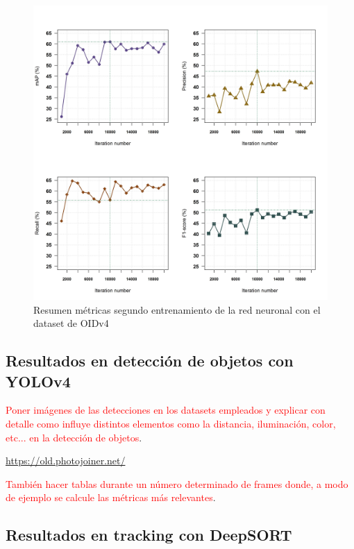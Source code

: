 \begin{figure}[ht]
\centering
\includegraphics[width=1\textwidth]{img/chapters/resultados/metricas/metrics-train2.png}
\caption{\label{fig:metrics-train2}Resumen métricas segundo entrenamiento de la red neuronal con el dataset de OIDv4}
\end{figure}

\newpage

\subsection{Resultados en detección de objetos con YOLOv4}
\label{subsec:resultados-yolov4-tf}

\textcolor{red}{Poner imágenes de las detecciones en los datasets empleados y explicar con detalle como influye distintos elementos como la distancia, iluminación, color, etc... en la detección de objetos}.

\url{https://old.photojoiner.net/}

\textcolor{red}{También hacer tablas durante un número determinado de frames donde, a modo de ejemplo se calcule las métricas más relevantes}.

\newpage

\subsection{Resultados en tracking con DeepSORT}
\label{subsec:resultados-deepsort}


